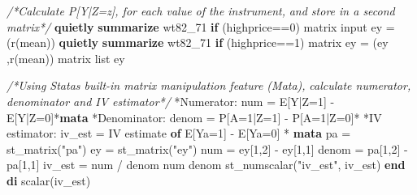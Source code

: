 \documentclass[
  10pt,
]{book}
\newenvironment{Shaded}{\begin{snugshade}}{\end{snugshade}}
\newcommand{\CommentTok}[1]{\textcolor[rgb]{0.56,0.35,0.01}{\textit{#1}}}
\newcommand{\FunctionTok}[1]{\textcolor[rgb]{0.00,0.00,0.00}{#1}}
\newcommand{\KeywordTok}[1]{\textcolor[rgb]{0.13,0.29,0.53}{\textbf{#1}}}
\newcommand{\NormalTok}[1]{#1}
\newcommand{\OtherTok}[1]{\textcolor[rgb]{0.56,0.35,0.01}{#1}}
\newcommand{\StringTok}[1]{\textcolor[rgb]{0.31,0.60,0.02}{#1}}
\begin{document}
\begin{Shaded}
\begin{Highlighting}[]
\CommentTok{/*Calculate P[Y|Z=z], for each value of the instrument, }
\CommentTok{and store in a second matrix*/}
\KeywordTok{quietly} \KeywordTok{summarize}\NormalTok{ wt82\_71 }\KeywordTok{if}\NormalTok{ (highprice==0)}
\FunctionTok{matrix}\NormalTok{ input ey = (}\OtherTok{\textasciigrave{}r(mean)\textquotesingle{}}\NormalTok{)}
\KeywordTok{quietly} \KeywordTok{summarize}\NormalTok{ wt82\_71 }\KeywordTok{if}\NormalTok{ (highprice==1)}
\FunctionTok{matrix}\NormalTok{ ey = (ey ,}\OtherTok{\textasciigrave{}r(mean)\textquotesingle{}}\NormalTok{)}
\FunctionTok{matrix} \OtherTok{list}\NormalTok{ ey}

\CommentTok{/*Using Stata\textquotesingle{}s built{-}in matrix manipulation feature (Mata), }
\CommentTok{calculate numerator, denominator and IV estimator*/}
\NormalTok{*Numerator: num = E[Y|Z=1] {-} E[Y|Z=0]*}\KeywordTok{mata}
\NormalTok{*Denominator: denom = P[A=1|Z=1] {-} P[A=1|Z=0]*}
\NormalTok{*IV estimator: iv\_est = IV estimate }\KeywordTok{of}\NormalTok{ E[Ya=1] {-} E[Ya=0] *}
\KeywordTok{mata} 
\NormalTok{pa = st\_matrix(}\StringTok{"pa"}\NormalTok{)}
\NormalTok{ey = st\_matrix(}\StringTok{"ey"}\NormalTok{)}
\NormalTok{num = ey[1,2] {-} ey[1,1] }
\NormalTok{denom = pa[1,2] {-} pa[1,1]}
\NormalTok{iv\_est = num / denom }
\NormalTok{num}
\NormalTok{denom}
\NormalTok{st\_numscalar(}\StringTok{"iv\_est"}\NormalTok{, iv\_est)}
\KeywordTok{end}
\KeywordTok{di} \FunctionTok{scalar}\NormalTok{(iv\_est)}
\end{Highlighting}
\end{Shaded}
\end{document}
